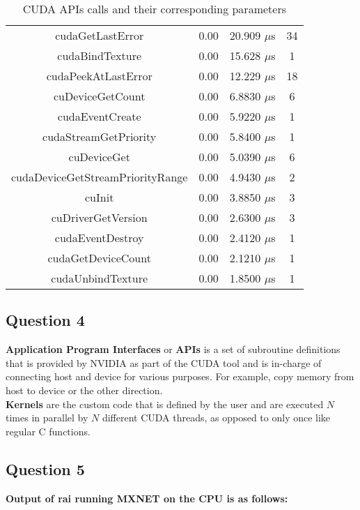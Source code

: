 \documentclass[12pt,titlepage]{article}
\begin{document}
\begin{table}[h!]
\begin{tabular}{||c | c | c | c||}
		cudaGetLastError                 & 0.00     & 20.909 $\mu$s & 34    \\
		cudaBindTexture                  & 0.00     & 15.628 $\mu$s & 1     \\
		cudaPeekAtLastError              & 0.00     & 12.229 $\mu$s & 18    \\
		cuDeviceGetCount                 & 0.00     & 6.8830 $\mu$s & 6     \\
		cudaEventCreate                  & 0.00     & 5.9220 $\mu$s & 1     \\
		cudaStreamGetPriority            & 0.00     & 5.8400 $\mu$s & 1     \\
		cuDeviceGet                      & 0.00     & 5.0390 $\mu$s & 6     \\
		cudaDeviceGetStreamPriorityRange & 0.00     & 4.9430 $\mu$s & 2     \\
		cuInit                           & 0.00     & 3.8850 $\mu$s & 3     \\
		cuDriverGetVersion               & 0.00     & 2.6300 $\mu$s & 3     \\
		cudaEventDestroy                 & 0.00     & 2.4120 $\mu$s & 1     \\
		cudaGetDeviceCount               & 0.00     & 2.1210 $\mu$s & 1     \\
		cudaUnbindTexture                & 0.00     & 1.8500 $\mu$s & 1     \\[1ex]
		\hline
	\end{tabular}
	\caption{CUDA APIs calls and their corresponding parameters}
\end{table}


\subsection*{Question 4}
\textbf{Application Program Interfaces} or \textbf{APIs} is a set of subroutine definitions that is provided by NVIDIA as part of the CUDA tool and is in-charge of connecting host and device for various purposes. For example, copy memory from host to device or the other direction.\\
\textbf{Kernels} are the custom code that is defined by the user and are executed $N$ times in parallel by $N$ different CUDA threads, as opposed to only once like regular C functions.


\subsection*{Question 5}
\textbf{Output of rai running MXNET on the CPU is as follows:}\\
\noindent{}
\end{document}
